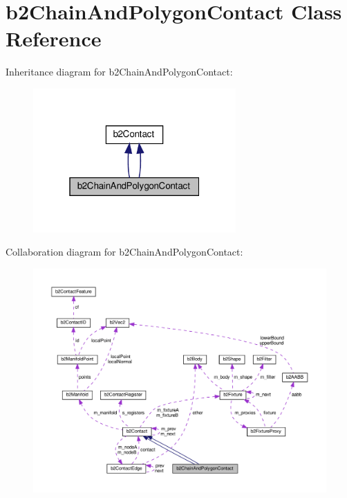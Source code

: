 \hypertarget{classb2ChainAndPolygonContact}{}\section{b2\+Chain\+And\+Polygon\+Contact Class Reference}
\label{classb2ChainAndPolygonContact}


Inheritance diagram for b2\+Chain\+And\+Polygon\+Contact\+:
\nopagebreak
\begin{figure}[H]
\begin{center}
\leavevmode
\includegraphics[width=220pt]{classb2ChainAndPolygonContact__inherit__graph}
\end{center}
\end{figure}


Collaboration diagram for b2\+Chain\+And\+Polygon\+Contact\+:
\nopagebreak
\begin{figure}[H]
\begin{center}
\leavevmode
\includegraphics[width=350pt]{classb2ChainAndPolygonContact__coll__graph}
\end{center}
\end{figure}
